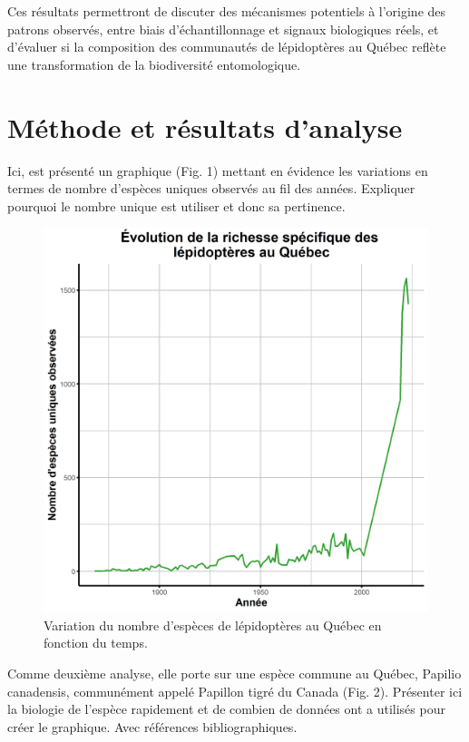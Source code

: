 \documentclass[9pt,twocolumn,twoside,]{pnas-new}
\begin{document}
Ces résultats permettront de discuter des mécanismes potentiels à
l'origine des patrons observés, entre biais d'échantillonnage et signaux
biologiques réels, et d'évaluer si la composition des communautés de
lépidoptères au Québec reflète une transformation de la biodiversité
entomologique.

\section{Méthode et résultats
d'analyse}\label{muxe9thode-et-ruxe9sultats-danalyse}

Ici, est présenté un graphique (Fig. 1) mettant en évidence les
variations en termes de nombre d'espèces uniques observés au fil des
années. Expliquer pourquoi le nombre unique est utiliser et donc sa
pertinence.

\begin{figure}
\includegraphics[width=0.9\linewidth]{../Figures_analyse/graphique_biodiversite} \caption{Variation du nombre d'espèces de lépidoptères au Québec en fonction du temps.}\label{fig:fig_graphique_biodiversite}
\end{figure}

Comme deuxième analyse, elle porte sur une espèce commune au Québec,
Papilio canadensis, communément appelé Papillon tigré du Canada (Fig.
2). Présenter ici la biologie de l'espèce rapidement et de combien de
données ont a utilisés pour créer le graphique. Avec références
bibliographiques.
\end{document}
